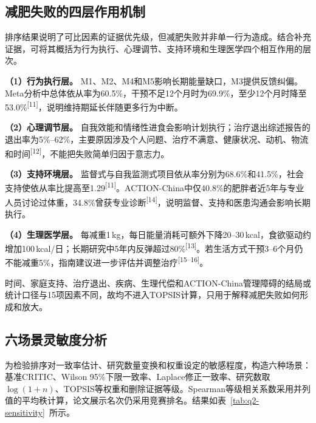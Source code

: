 \subsection{减肥失败的四层作用机制}

排序结果说明了可比因素的证据优先级，但减肥失败并非单一行为造成。结合补充证据，可将其概括为行为执行、心理调节、支持环境和生理医学四个相互作用的层次。

\textbf{（1）行为执行层。} M1、M2、M4和M5影响长期能量缺口，M3提供反馈纠偏。Meta分析中总体依从率为60.5\%，干预不足12个月时为69.9\%，至少12个月时降至53.0\%\textsuperscript{[11]}，说明维持期延长伴随更多行为中断。

\textbf{（2）心理调节层。} 自我效能和情绪性进食会影响计划执行；治疗退出综述报告的退出率为5\%--62\%，主要原因涉及个人问题、治疗不满意、健康状况、动机、物流和时间\textsuperscript{[12]}，不能把失败简单归因于意志力。

\textbf{（3）支持环境层。} 监督式与自我监测式项目依从率分别为68.6\%和41.5\%，社会支持使依从率比提高至1.29\textsuperscript{[11]}。ACTION-China中仅40.8\%的肥胖者近5年与专业人员讨论过体重，34.8\%曾获专业诊断\textsuperscript{[14]}，说明监督、支持和医患沟通会影响长期执行。

\textbf{（4）生理医学层。} 每减重1\,kg，每日能量消耗可额外下降20--30\,kcal，食欲驱动约增加100\,kcal/日；长期研究中5年内反弹超过80\%\textsuperscript{[13]}。若生活方式干预3--6个月仍不能减重5\%，指南建议进一步评估并调整治疗\textsuperscript{[15--16]}。

时间、家庭支持、治疗退出、疾病、生理代偿和ACTION-China管理障碍的结局或统计口径与15项因素不同，故均不进入TOPSIS计算，只用于解释减肥失败如何形成和放大。

\subsection{六场景灵敏度分析}

为检验排序对一致率估计、研究数量变换和权重设定的敏感程度，构造六种场景：基准CRITIC、Wilson 95\%下限一致率、Laplace修正一致率、研究数取$\log(1+n)$、TOPSIS等权重和删除证据等级。Spearman等级相关系数采用并列值的平均秩计算，论文展示名次仍采用竞赛排名。结果如表~\ref{tab:q2-sensitivity}~所示。


